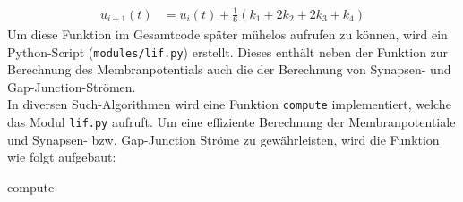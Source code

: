 	\begin{align}
		\label{eq:runkgekutta_erg}
		u_{i+1}(t) &= u_i(t) + \tfrac{1}{6} (k_1 + 2 k_2 + 2 k_3 + k_4)
	\end{align}
	Um diese Funktion im Gesamtcode später mühelos aufrufen zu können, wird ein Python-Script (\texttt{modules/lif.py}) erstellt. Dieses enthält neben der Funktion zur Berechnung des Membranpotentials auch die der Berechnung von Synapsen- und Gap-Junction-Strömen.\\
	In diversen Such-Algorithmen wird eine Funktion \texttt{compute} implementiert, welche das Modul \texttt{lif.py} aufruft. Um eine effiziente Berechnung der Membranpotentiale und Synapsen- bzw. Gap-Junction Ströme zu gewährleisten, wird die Funktion wie folgt aufgebaut:
	\begin{algorithm}
		
		
		\caption{compute}
	\end{algorithm}\\
